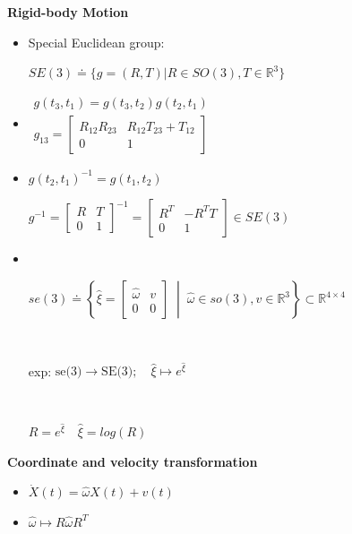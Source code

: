 \documentclass{../cheat}
\begin{document}
\begin{multicols}{3}
	\textbf{Rigid-body Motion}
	\begin{itemize}
		\item Special Euclidean group:\\
			\centerline{$SE(3)\doteq\{g=(R,T)|R\in SO(3) , T \in \mathbb{R}^3\}$}
		\item {}  $\begin{array}{l}
			g(t_3,t_1)=g(t_3,t_2)g(t_2,t_1) \\
			g_{13}=\begin{bmatrix}	R_{12}R_{23} & R_{12}T_{23}+T_{12} \\ 0 & 1 \end{bmatrix}
			\end{array} $
		\item {} $g(t_2,t_1)^{-1}=g(t_1,t_2)$\\
			\centerline{$g^{-1}=\begin{bmatrix}	R & T \\ 0 & 1 \end{bmatrix}^{-1}=
			\begin{bmatrix}	R^T & -R^T T \\ 0 & 1 \end{bmatrix} \in SE(3)$}
		\item {} \\
			\centerline{$se(3)\doteq \left\lbrace \widehat{\xi}=
				\begin{bmatrix} \widehat{\omega} & v \\ 0 & 0 \end{bmatrix} \;\middle|\; 
			 	\widehat{\omega} \in so(3), v \in \mathbb{R}^3 \right\rbrace \subset \mathbb{R}^{4\times4} $}\\
		 	\centerline{exp: $\text{se(3)} \rightarrow \text{SE(3)}; \quad \widehat{\xi} \mapsto e^{\widehat{\xi}}$}\\
		 	\centerline{$R=e^{\widehat{\xi}} \quad \widehat{\xi}=log(R)$}
	\end{itemize}


	\textbf{Coordinate and velocity transformation}
	\begin{itemize}
		\item {} $\dot{X}(t)=\widehat{\omega}X(t)+v(t)$
		\item {} $\widehat{\omega} \mapsto R\widehat{\omega}R^T$
	\end{itemize}
		

\end{multicols}
\end{document}
